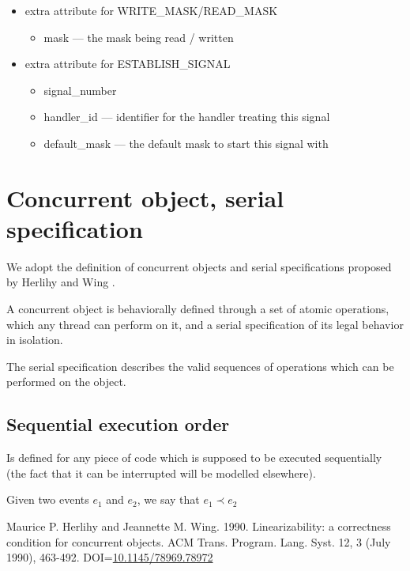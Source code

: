 \documentclass{article}
\begin{document}
\begin{itemize}
\begin{itemize}
\end{itemize}
\item extra attribute for WRITE\_MASK/READ\_MASK
\begin{itemize}
\item mask --- the mask being read / written
\end{itemize}
\item extra attribute for ESTABLISH\_SIGNAL
\begin{itemize}
  \item signal\_number 
  \item handler\_id --- identifier for the handler treating this signal
  \item default\_mask --- the default mask to start this signal with
\end{itemize}
\end{itemize}

\section{Concurrent object, serial specification}

We adopt the definition of concurrent objects and serial specifications proposed
by Herlihy and Wing \cite{herlihy-wing-1990}.

A concurrent object is behaviorally defined through a set of atomic operations,
which any thread can perform on it, and a serial specification of its legal
behavior in isolation.

The serial specification describes the valid sequences of operations which can
be performed on the object.


\subsection{Sequential execution order}

Is defined for any piece of code which is supposed to be executed sequentially 
(the fact that it can be interrupted will be modelled elsewhere).

Given two events $e_1$ and $e_2$, we say that $e_1\prec e_2$

\begin{thebibliography}{00}

 Maurice P. Herlihy and Jeannette M. Wing. 1990.
Linearizability: a correctness condition for concurrent objects.
ACM Trans. Program. Lang. Syst. 12, 3 (July 1990), 463-492.
DOI=\href{http://dx.doi.org/10.1145/78969.78972}{10.1145/78969.78972}
\end{thebibliography}
\end{document}

